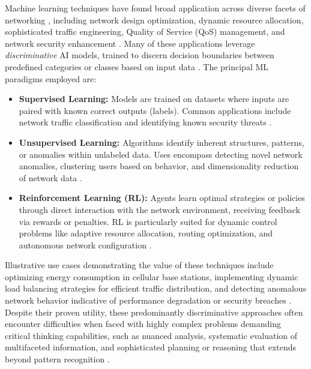 \documentclass[sigconf]{acmart}
\begin{document}
Machine learning techniques have found broad application across diverse facets of networking \cite{ref12}, including network design optimization, dynamic resource allocation, sophisticated traffic engineering, Quality of Service (QoS) management, and network security enhancement \cite{ref1, ref12}. Many of these applications leverage \textit{discriminative} AI models, trained to discern decision boundaries between predefined categories or classes based on input data \cite{ref6}. The principal ML paradigms employed are:
\begin{itemize}
    \begin{itemize}
\item \textbf{Supervised Learning:} Models are trained on datasets where inputs are paired with known correct outputs (labels). Common applications include network traffic classification and identifying known security threats \cite{ref1}.
\end{itemize}
    \begin{itemize}
\item \textbf{Unsupervised Learning:} Algorithms identify inherent structures, patterns, or anomalies within unlabeled data. Uses encompass detecting novel network anomalies, clustering users based on behavior, and dimensionality reduction of network data \cite{ref1}.
\end{itemize}
    \begin{itemize}
\item \textbf{Reinforcement Learning (RL):} Agents learn optimal strategies or policies through direct interaction with the network environment, receiving feedback via rewards or penalties. RL is particularly suited for dynamic control problems like adaptive resource allocation, routing optimization, and autonomous network configuration \cite{ref1}.
\end{itemize}
\end{itemize}
Illustrative use cases demonstrating the value of these techniques include optimizing energy consumption in cellular base stations, implementing dynamic load balancing strategies for efficient traffic distribution, and detecting anomalous network behavior indicative of performance degradation or security breaches \cite{ref1, ref6}. Despite their proven utility, these predominantly discriminative approaches often encounter difficulties when faced with highly complex problems demanding critical thinking capabilities, such as nuanced analysis, systematic evaluation of multifaceted information, and sophisticated planning or reasoning that extends beyond pattern recognition \cite{ref6}.
\end{document}
